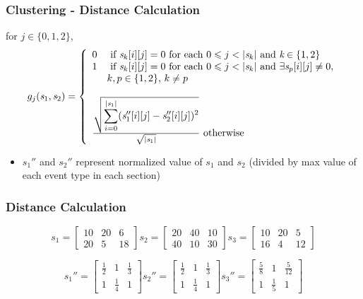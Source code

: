 \documentclass{beamer}
\begin{document}
\begin{frame}
\frametitle{Clustering - Distance Calculation}
for $j  \in \{0,1,2\}$,
\[g_j(\textit{s}_1,\textit{s}_2) = \left\{
  \begin{array}{ll}
    0 & \text{ if } \textit{s}_k\lbrack i \rbrack\lbrack j \rbrack=0 \text{ for each } 0 \leqslant j < |\textit{s}_k|\text{ and } \textit{k} \in \{1,2\}\\
    1 & \text{ if } \textit{s}_k\lbrack i \rbrack\lbrack j \rbrack=0 \text{ for each } 0 \leqslant j < |\textit{s}_k| \text{ and } \exists \textit{s}_p\lbrack i \rbrack\lbrack j \rbrack \neq 0,\\
      & k,p \in \{1,2\} \text{, } k \neq p\\
      & \\
	\multicolumn{2}{l}{\frac{\sqrt{\displaystyle\sum_{i=0}^{\lvert\textit{s}_1\lvert} (\textit{s}_1''\lbrack i \rbrack\lbrack j \rbrack - \textit{s}_2''\lbrack i \rbrack\lbrack j \rbrack)^2}}{\sqrt{\lvert\textit{s}_1\rvert}} \text{ otherwise}} 
  \end{array}
\right.
\]
\begin{itemize}
\item $s_1''$ and $s_2''$ represent normalized value of $s_1$ and $s_2$ (divided by max value of each event type in each section)

\end{itemize}
\end{frame}

\begin{frame}
\frametitle{Distance Calculation}
\[
\textit{s}_1 = \begin{bmatrix}
  10 & 20 & 6\\
  20 & 5 & 18
\end{bmatrix}
\textit{s}_2 = \begin{bmatrix}
  20 & 40 & 10\\ 
  40 & 10 & 30
\end{bmatrix}
\textit{s}_3 = \begin{bmatrix}
  10 & 20 & 5\\
  16 & 4 & 12 
\end{bmatrix}
\]

\[
s_1'' = \begin{bmatrix}
  \frac{1}{2} & 1 & \frac{1}{3}\\ 
  1 & \frac{1}{4} & 1
\end{bmatrix}
s_2'' = \begin{bmatrix}
  \frac{1}{2} & 1 & \frac{1}{3}\\ 
  1 & \frac{1}{4} & 1
\end{bmatrix}
s_3'' = \begin{bmatrix}
  \frac{5}{8} & 1 & \frac{5}{12}\\
  1 & \frac{1}{5} & 1 
\end{bmatrix}
\]
\end{frame}
\end{document}
